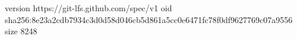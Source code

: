 version https://git-lfs.github.com/spec/v1
oid sha256:8e23a2cdb7934c3d0d58d046cb5d861a5cc0e6471fc78f0df9627769c07a9556
size 8248

